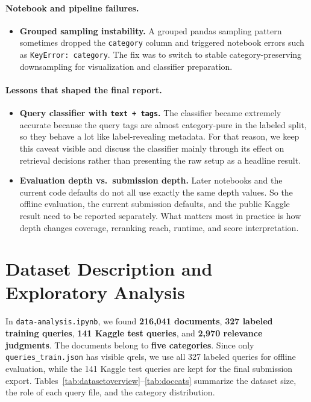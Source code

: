 \documentclass[11pt,a4paper]{article}
\begin{document}
\paragraph{Notebook and pipeline failures.}
\begin{itemize}
    \item \textbf{Grouped sampling instability.} A grouped pandas sampling pattern sometimes dropped the \texttt{category} column and triggered notebook errors such as \texttt{KeyError: category}. The fix was to switch to stable category-preserving downsampling for visualization and classifier preparation.
\end{itemize}

\paragraph{Lessons that shaped the final report.}
\begin{itemize}
    \item \textbf{Query classifier with \texttt{text + tags}.} The classifier became extremely accurate because the query tags are almost category-pure in the labeled split, so they behave a lot like label-revealing metadata. For that reason, we keep this caveat visible and discuss the classifier mainly through its effect on retrieval decisions rather than presenting the raw setup as a headline result.
    \item \textbf{Evaluation depth vs.\ submission depth.} Later notebooks and the current code defaults do not all use exactly the same depth values. So the offline evaluation, the current submission defaults, and the public Kaggle result need to be reported separately. What matters most in practice is how depth changes coverage, reranking reach, runtime, and score interpretation.
\end{itemize}

\section{Dataset Description and Exploratory Analysis}

In \texttt{data-analysis.ipynb}, we found \textbf{216,041 documents}, \textbf{327 labeled training queries}, \textbf{141 Kaggle test queries}, and \textbf{2,970 relevance judgments}. The documents belong to \textbf{five categories}. Since only \texttt{queries\_train.json} has visible qrels, we use all 327 labeled queries for offline evaluation, while the 141 Kaggle test queries are kept for the final submission export. Tables~\ref{tab:datasetoverview}--\ref{tab:doccats} summarize the dataset size, the role of each query file, and the category distribution.
\end{document}
